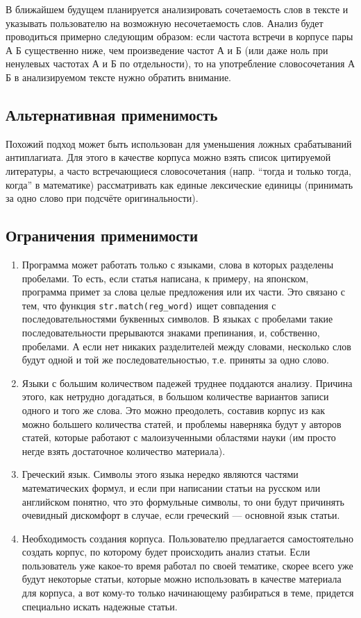 \documentclass[a4paper,openbib]{report}
\begin{document}
В ближайшем будущем планируется анализировать сочетаемость слов в тексте и указывать пользователю на возможную несочетаемость слов. Анализ будет проводиться примерно 
следующим образом: если частота встречи в корпусе пары А Б существенно ниже, чем произведение частот А и Б (или даже ноль при ненулевых частотах А и Б по отдельности), 
то на употребление словосочетания А Б в анализируемом тексте нужно обратить внимание.

\subsection*{Альтернативная применимость}

Похожий подход может быть использован для уменьшения ложных срабатываний антиплагиата.
Для этого в качестве корпуса можно взять список цитируемой литературы, а часто встречающиеся словосочетания (напр. ``тогда и только тогда, когда'' в математике) 
рассматривать как единые лексические единицы (принимать за одно слово при подсчёте оригинальности).

\subsection*{Ограничения применимости}

\begin{enumerate}
\item
 Программа может работать только с языками, слова в которых разделены пробелами.
То есть, если статья написана, к примеру, на японском, программа примет за слова целые предложения или их части. Это связано с тем, что функция 
\verb|str.match(reg_word)| ищет совпадения с последовательностями буквенных символов. В языках с пробелами такие последовательности прерываются знаками препинания, 
и, собственно, пробелами. А если нет никаких разделителей между словами, несколько слов будут одной и той же последовательностью, т.е. приняты за одно слово.
\item
 Языки с большим количеством падежей труднее поддаются анализу.
Причина этого, как нетрудно догадаться, в большом количестве вариантов записи одного и того же слова. Это можно преодолеть, составив корпус из как можно большего 
количества статей, и проблемы наверняка будут у авторов статей, которые работают с малоизученными областями науки (им просто негде взять достаточное количество материала).
\item
 Греческий язык.
Символы этого языка нередко являются частями математических формул, и если при написании статьи на русском или английском понятно, что это формульные символы, 
то они будут причинять очевидный дискомфорт в случае, если греческий --- основной язык статьи.
\item
 Необходимость создания корпуса.
Пользователю предлагается самостоятельно создать корпус, по которому будет происходить анализ статьи. Если пользователь уже какое-то время работал по своей тематике, скорее всего 
уже будут некоторые статьи, которые можно использовать в качестве материала для корпуса, а вот кому-то только начинающему разбираться в теме, придется специально искать 
надежные статьи.
\end{enumerate}
\end{document}
